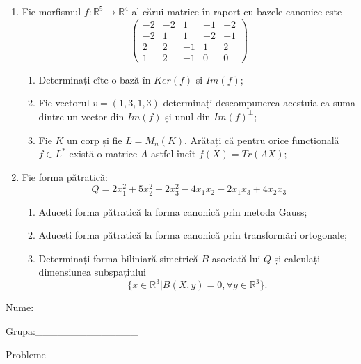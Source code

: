\documentclass{article}
\begin{document}
\begin{enumerate}
 \item Fie morfismul $f:\mathbb{R}^5 \to \mathbb{R}^4$ al cărui matrice în raport cu bazele canonice este
$$\begin{pmatrix}
-2&-2&1&-1&-2\\
-2&1&1&-2&-1\\
2&2&-1&1&2\\
1&2&-1&0&0
\end{pmatrix}$$

\begin{enumerate}
\item Determinați cîte o bază în $Ker(f)$ și $Im(f)$;
\item Fie vectorul $v=(1,3,1,3)$ determinați descompunerea acestuia ca suma dintre un vector din $Im(f)$ și unul din $Im(f)^\perp$;
\item Fie $K$ un corp și fie $L=M_n(K)$. Arătați că pentru orice funcțională $f \in L^*$ există o matrice $A$ astfel încît $f(X)=Tr(AX)$;
\end{enumerate}
\item Fie forma pătratică:
$$Q= 2x_1^2+5x_2^2+2x_3^2-4x_1x_2-2x_1x_3+4x_2x_3$$

\begin{enumerate}
\item Aduceți forma pătratică la forma canonică prin metoda Gauss;
\item Aduceți forma pătratică la forma canonică prin transformări ortogonale;
\item Determinați forma biliniară simetrică $B$ asociată lui $Q$ și calculați dimensiunea subspațiului
$$\{x \in \mathbb{R}^3 | B(X,y)=0,\forall y \in \mathbb{R}^3\}.$$

\end{enumerate}
\end{enumerate}
\newpage
\begin{flushright}
Nume:\_\_\_\_\_\_\_\_\_\_\_\_\_\_
 
 
Grupa:\_\_\_\_\_\_\_\_\_\_\_\_\_\_
\end{flushright}
\begin{center}
\vspace{2cm}
{\Large Probleme}
\vspace{2cm}
\end{center}
\end{document}
